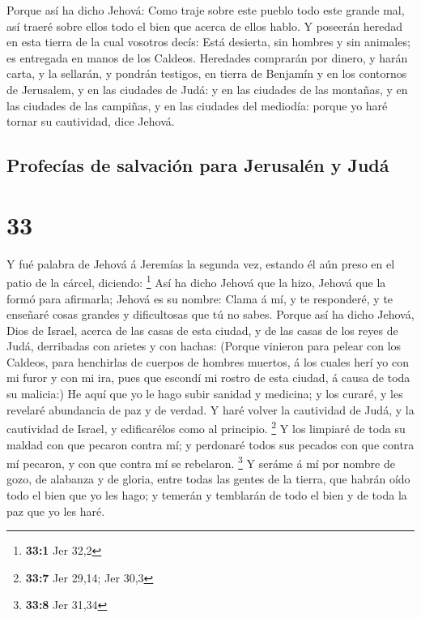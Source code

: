  Porque así ha dicho Jehová: Como traje sobre este pueblo
todo este grande mal, así traeré sobre ellos todo el bien que acerca de
ellos hablo.  Y poseerán heredad en esta tierra de la cual
vosotros decís: Está desierta, sin hombres y sin animales; es entregada
en manos de los Caldeos.  Heredades comprarán por dinero, y
harán carta, y la sellarán, y pondrán testigos, en tierra de Benjamín y
en los contornos de Jerusalem, y en las ciudades de Judá: y en las
ciudades de las montañas, y en las ciudades de las campiñas, y en las
ciudades del mediodía: porque yo haré tornar su cautividad, dice Jehová.

\hypertarget{profecuxedas-de-salvaciuxf3n-para-jerusaluxe9n-y-juduxe1}{%
\subsection{Profecías de salvación para Jerusalén y
Judá}\label{profecuxedas-de-salvaciuxf3n-para-jerusaluxe9n-y-juduxe1}}

\hypertarget{section-32}{%
\section{33}\label{section-32}}

 Y fué palabra de Jehová á Jeremías la segunda vez, estando
él aún preso en el patio de la cárcel, diciendo: \footnote{\textbf{33:1}
  Jer 32,2}  Así ha dicho Jehová que la hizo, Jehová que la
formó para afirmarla; Jehová es su nombre:  Clama á mí, y te
responderé, y te enseñaré cosas grandes y dificultosas que tú no sabes.
 Porque así ha dicho Jehová, Dios de Israel, acerca de las
casas de esta ciudad, y de las casas de los reyes de Judá, derribadas
con arietes y con hachas:  (Porque vinieron para pelear con
los Caldeos, para henchirlas de cuerpos de hombres muertos, á los cuales
herí yo con mi furor y con mi ira, pues que escondí mi rostro de esta
ciudad, á causa de toda su malicia:)  He aquí que yo le hago
subir sanidad y medicina; y los curaré, y les revelaré abundancia de paz
y de verdad.  Y haré volver la cautividad de Judá, y la
cautividad de Israel, y edificarélos como al principio. \footnote{\textbf{33:7}
  Jer 29,14; Jer 30,3}  Y los limpiaré de toda su maldad con
que pecaron contra mí; y perdonaré todos sus pecados con que contra mí
pecaron, y con que contra mí se rebelaron. \footnote{\textbf{33:8} Jer
  31,34}  Y seráme á mí por nombre de gozo, de alabanza y de
gloria, entre todas las gentes de la tierra, que habrán oído todo el
bien que yo les hago; y temerán y temblarán de todo el bien y de toda la
paz que yo les haré.

